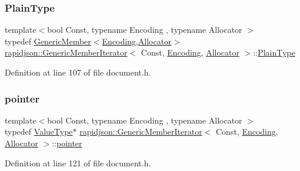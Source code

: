 \subsubsection{\texorpdfstring{PlainType}{PlainType}}
{\footnotesize\ttfamily template$<$bool Const, typename Encoding , typename Allocator $>$ \\
typedef \mbox{\hyperlink{structrapidjson_1_1_generic_member}{Generic\+Member}}$<$\mbox{\hyperlink{classrapidjson_1_1_encoding}{Encoding}},\mbox{\hyperlink{classrapidjson_1_1_allocator}{Allocator}}$>$ \mbox{\hyperlink{classrapidjson_1_1_generic_member_iterator}{rapidjson\+::\+Generic\+Member\+Iterator}}$<$ Const, \mbox{\hyperlink{classrapidjson_1_1_encoding}{Encoding}}, \mbox{\hyperlink{classrapidjson_1_1_allocator}{Allocator}} $>$\+::\mbox{\hyperlink{classrapidjson_1_1_generic_member_iterator_abbee93e8c55379249e99c1d5c4255661}{Plain\+Type}}\hspace{0.3cm}{\ttfamily [private]}}



Definition at line 107 of file document.\+h.

\mbox{\label{classrapidjson_1_1_generic_member_iterator_a72c5c50dc9df5622b0be822dad59e372}} 
\subsubsection{\texorpdfstring{pointer}{pointer}}
{\footnotesize\ttfamily template$<$bool Const, typename Encoding , typename Allocator $>$ \\
typedef \mbox{\hyperlink{classrapidjson_1_1_generic_member_iterator_ad2b02bbaddb3cc35db1d6a70d7850481}{Value\+Type}}$\ast$ \mbox{\hyperlink{classrapidjson_1_1_generic_member_iterator}{rapidjson\+::\+Generic\+Member\+Iterator}}$<$ Const, \mbox{\hyperlink{classrapidjson_1_1_encoding}{Encoding}}, \mbox{\hyperlink{classrapidjson_1_1_allocator}{Allocator}} $>$\+::\mbox{\hyperlink{classrapidjson_1_1_generic_member_iterator_a72c5c50dc9df5622b0be822dad59e372}{pointer}}}



Definition at line 121 of file document.\+h.

